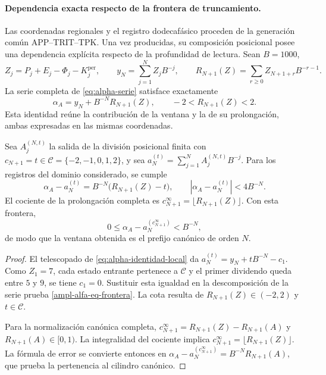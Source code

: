 \paragraph{Dependencia exacta respecto de la frontera de truncamiento.}
\label{ampl-alfa-frontera-exacta}
Las coordenadas regionales y el registro dodecafásico proceden de la
generación común APP--TRIT--TPK. Una vez producidas, su composición
posicional posee una dependencia explícita respecto de la profundidad
de lectura. Sean $B=1000$,
\[
 Z_j=P_j+E_j-\Phi_j-K_j^{\mathrm{per}},\qquad
 y_N=\sum_{j=1}^{N}Z_jB^{-j},\qquad
 R_{N+1}(Z)=\sum_{r\geq0}Z_{N+1+r}B^{-r-1}.
\]
La serie completa de \eqref{eq:alpha-serie} satisface exactamente
\[
 \alpha_A=y_N+B^{-N}R_{N+1}(Z),\qquad
 -2<R_{N+1}(Z)<2.
\]
Esta identidad reúne la contribución de la ventana y la de su
prolongación, ambas expresadas en las mismas coordenadas.

\begin{proposition}
\label{ampl-alfa-prop-frontera}
Sea $A_j^{(N,t)}$ la salida de la división posicional finita con
$c_{N+1}=t\in\mathcal C=\{-2,-1,0,1,2\}$, y sea
$a_N^{(t)}=\sum_{j=1}^{N}A_j^{(N,t)}B^{-j}$. Para los registros del
dominio considerado, se cumple
\begin{equation}
 \alpha_A-a_N^{(t)}
 =B^{-N}\bigl(R_{N+1}(Z)-t\bigr),
 \qquad
 |\alpha_A-a_N^{(t)}|<4B^{-N}.
 \label{ampl-alfa-eq-frontera}
\end{equation}
El cociente de la prolongación completa es
$c_{N+1}^{\infty}=\lfloor R_{N+1}(Z)\rfloor$. Con esta frontera,
\[
 0\leq\alpha_A-a_N^{(c_{N+1}^{\infty})}<B^{-N},
\]
de modo que la ventana obtenida es el prefijo canónico de orden $N$.
\end{proposition}
\begin{proof}
El telescopado de \eqref{eq:alpha-identidad-local} da
$a_N^{(t)}=y_N+tB^{-N}-c_1$. Como $Z_1=7$, cada estado entrante
pertenece a $\mathcal C$ y el primer dividendo queda entre $5$ y $9$,
se tiene $c_1=0$. Sustituir esta igualdad en la descomposición de la
serie prueba \eqref{ampl-alfa-eq-frontera}. La cota resulta de
$R_{N+1}(Z)\in(-2,2)$ y $t\in\mathcal C$.

Para la normalización canónica completa,
$c_{N+1}^{\infty}=R_{N+1}(Z)-R_{N+1}(A)$ y
$R_{N+1}(A)\in[0,1)$. La integralidad del cociente implica
$c_{N+1}^{\infty}=\lfloor R_{N+1}(Z)\rfloor$. La fórmula de error
se convierte entonces en
$\alpha_A-a_N^{(c_{N+1}^{\infty})}=B^{-N}R_{N+1}(A)$, que prueba
la pertenencia al cilindro canónico.
\end{proof}

